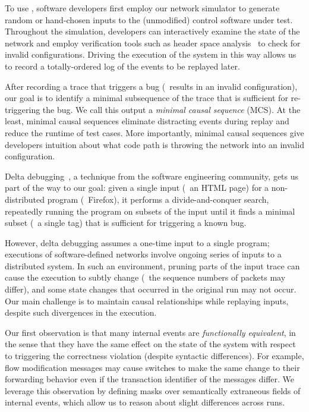 To use \simulator, software developers first employ our network simulator to generate
random or hand-chosen inputs
to the (unmodified) control software under test. Throughout the simulation,
developers can interactively examine the state of the network
and employ verification tools such as header space analysis~\cite{hsa} to check
for invalid configurations. Driving the
execution of the system in this way allows us to record a
totally-ordered log of the events to be replayed later.

After recording a trace that triggers a bug (\ie~results in an invalid configuration), our goal is to identify a minimal
subsequence of the trace that is sufficient for re-triggering the bug. We
call this output a {\em minimal causal sequence} (MCS).
At the least, minimal causal sequences eliminate distracting events during
replay and reduce the runtime of test cases.
More importantly,
minimal causal sequences give developers intuition about what code path is throwing
the network into an invalid configuration.

Delta debugging~\cite{Zeller:1999:YMP:318773.318946}, a technique from the
software engineering community, gets us part of the way
to our goal: given a single input (\eg~an HTML page)
for a non-distributed program (\eg~Firefox), it performs a divide-and-conquer
search, repeatedly running the program on subsets of the input
until it finds a minimal subset (\eg~a single tag) that is sufficient
for triggering a known bug.

However, delta debugging assumes a one-time input to a single program;
executions of software-defined networks involve ongoing series of inputs to a distributed system.
In such an environment, pruning parts of the input trace can cause the execution to
subtly change (\eg~the sequence numbers of packets may differ), and some
state changes that occurred in the original run may not occur. Our main
challenge is to maintain causal relationships while replaying inputs,
despite such divergences in the execution.

Our first observation is that many internal events are {\em functionally
equivalent}, in the sense that they
have the same effect on the state of the system with respect to triggering the
correctness violation (despite syntactic differences). For example, flow
modification messages may cause switches to make the same change to their forwarding behavior
even if the transaction identifier of the messages differ. We leverage this observation by defining
masks over semantically extraneous fields of
internal events, which allow us to reason about slight differences across
runs.

